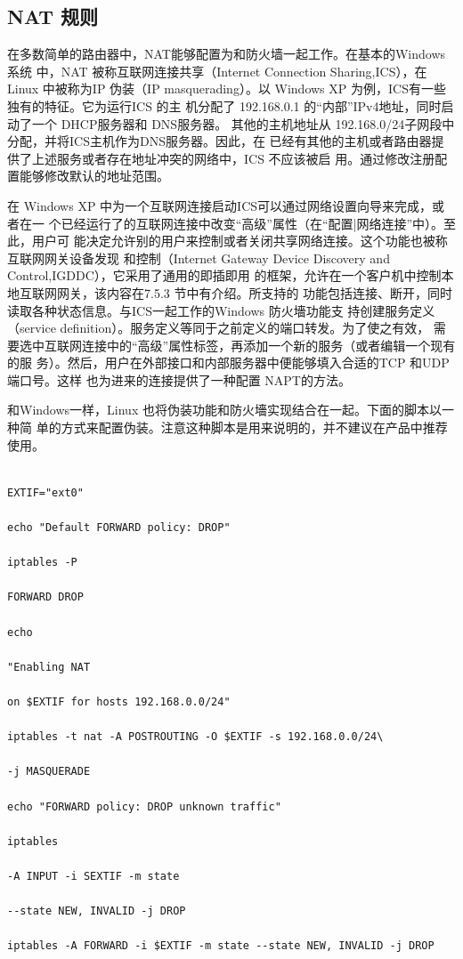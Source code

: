 \subsection{NAT 规则}

在多数简单的路由器中，NAT能够配置为和防火墙一起工作。在基本的Windows 系统
中，NAT 被称互联网连接共享（Internet Connection Sharing,ICS），在 Linux 中被称为IP
伪装（IP masquerading）。以 Windows XP 为例，ICS有一些独有的特征。它为运行ICS 的主
机分配了 192.168.0.1 的“内部”IPv4地址，同时启动了一个 DHCP服务器和 DNS服务器。
其他的主机地址从 192.168.0/24子网段中分配，并将ICS主机作为DNS服务器。因此，在
已经有其他的主机或者路由器提供了上述服务或者存在地址冲突的网络中，ICS 不应该被启
用。通过修改注册配置能够修改默认的地址范围。

在 Windows XP 中为一个互联网连接启动ICS可以通过网络设置向导来完成，或者在一
个已经运行了的互联网连接中改变“高级”属性（在“配置|网络连接”中）。至此，用户可
能决定允许别的用户来控制或者关闭共享网络连接。这个功能也被称互联网网关设备发现
和控制（Internet Gateway Device Discovery and Control,IGDDC），它采用了通用的即插即用
的框架，允许在一个客户机中控制本地互联网网关，该内容在7.5.3 节中有介绍。所支持的
功能包括连接、断开，同时读取各种状态信息。与ICS一起工作的Windows 防火墻功能支
持创建服务定义（service definition）。服务定义等同于之前定义的端口转发。为了使之有效，
需要选中互联网连接中的“高级”属性标签，再添加一个新的服务（或者编辑一个现有的服
务）。然后，用户在外部接口和内部服务器中便能够填入合适的TCP 和UDP端口号。这样
也为进来的连接提供了一种配置 NAPT的方法。

和Windows一样，Linux 也将伪装功能和防火墻实现结合在一起。下面的脚本以一种简
单的方式来配置伪装。注意这种脚本是用来说明的，并不建议在产品中推荐使用。

\begin{verbatim}
    
EXTIF="ext0"

echo "Default FORWARD policy: DROP"

iptables -P

FORWARD DROP

echo

"Enabling NAT

on $EXTIF for hosts 192.168.0.0/24"

iptables -t nat -A POSTROUTING -O $EXTIF -s 192.168.0.0/24\

-j MASQUERADE

echo "FORWARD policy: DROP unknown traffic"

iptables

-A INPUT -i SEXTIF -m state

--state NEW, INVALID -j DROP

iptables -A FORWARD -i $EXTIF -m state --state NEW, INVALID -j DROP
\end{verbatim}

